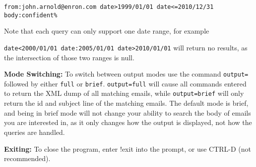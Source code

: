 \verb|from:john.arnold@enron.com date>1999/01/01 date<=2010/12/31 body:confident%|

Note that each query can only support one date range, for example 

\verb|date<2000/01/01 date:2005/01/01 date>2010/01/01| will return no results, as the 
intersection of those two ranges is null.

\textbf{Mode Switching: }
To switch between output modes use the command \verb|output=| followed by either \verb|full| or 
\verb|brief|.  \verb|output=full| will cause all commands entered to return the XML dump of all 
matching emails, while \verb|output=brief| will only return the id and subject line of the matching 
emails.  The default mode is brief, and being in brief mode will not change your ability to search 
the body of emails you are interested in, as it only changes how the output is displayed, not how 
the queries are handled. 

\textbf{Exiting: }
To close the program, enter !exit into the prompt, or use CTRL-D (not recommended).   
